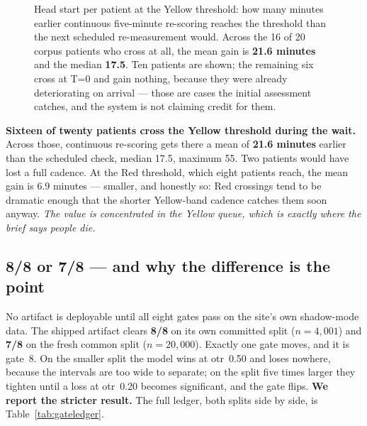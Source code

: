 \documentclass[10pt,a4paper,twocolumn]{article}
\begin{document}
\begin{figure}[t]
\centering
{}
\caption{Head start per patient at the Yellow threshold: how many minutes earlier continuous
five-minute re-scoring reaches the threshold than the next scheduled re-measurement would.
Across the 16 of 20 corpus patients who cross at all, the mean gain is \textbf{21.6 minutes} and
the median \textbf{17.5}. Ten patients are shown; the remaining six cross at T=0 and gain nothing,
because they were already deteriorating on arrival --- those are cases the initial assessment
catches, and the system is not claiming credit for them.}
\label{fig:headstart}
\end{figure}

\textbf{Sixteen of twenty patients cross the Yellow threshold during the wait.} Across those,
continuous re-scoring gets there a mean of \textbf{21.6 minutes} earlier than the scheduled check,
median 17.5, maximum 55. Two patients would have lost a full cadence. At the Red threshold, which
eight patients reach, the mean gain is 6.9 minutes --- smaller, and honestly so: Red crossings tend
to be dramatic enough that the shorter Yellow-band cadence catches them soon anyway. \emph{The
value is concentrated in the Yellow queue, which is exactly where the brief says people die.}


\subsection{8/8 or 7/8 --- and why the difference is the point}
No artifact is deployable until all eight gates pass on the site's own shadow-mode data. The
shipped artifact clears \textbf{8/8} on its own committed split ($n{=}4{,}001$) and \textbf{7/8}
on the fresh common split ($n{=}20{,}000$). Exactly one gate moves, and it is gate~8. On the
smaller split the model wins at otr~0.50 and loses nowhere, because the intervals are too wide to
separate; on the split five times larger they tighten until a loss at otr~0.20 becomes significant,
and the gate flips. \textbf{We report the stricter result.} The full ledger, both splits side by
side, is Table~\ref{tab:gateledger}.
\end{document}
